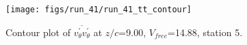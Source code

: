 \begin{figure}[H]
\centering
\texttt{[image: figs/run\_41/run\_41\_tt\_contour]}
\caption{Contour plot of $\overline{v_{\theta}^{\prime} v_{\theta}^{\prime}}$ at $z/c$=9.00, $V_{free}$=14.88, station 5.}
\label{fig:run_41_tt_contour}
\end{figure}


